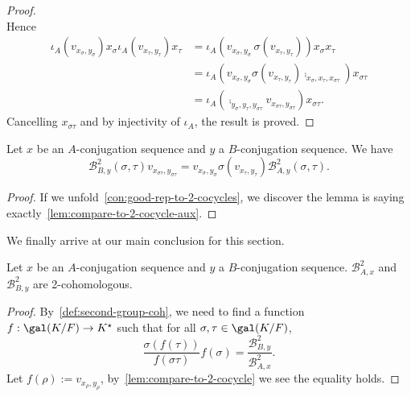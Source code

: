 \begin{proof}
\[  \]
  Hence
  \[
    \begin{aligned}    \iota_{A}\left(v_{x_{\sigma},y_{\sigma}}\right)x_{\sigma}\iota_{A}\left(v_{x_{\tau},y_{\tau}}\right)x_{\tau} &=
                                                                                                                                      \iota_{A}\left(v_{x_{\sigma},y_{\sigma}}\, \sigma\left(v_{x_{\tau},y_{\tau}}\right)\right) x_{\sigma}x_{\tau} \\
      &= \iota_{A}\left(v_{x_{\sigma},y_{\sigma}}\sigma\left(v_{x_{\tau},y_{\tau}}\right)\comp_{x_{\sigma},x_{\tau},x_{\sigma\tau}}\right)x_{\sigma\tau}\\
      &= \iota_{A}\left(\comp_{y_{\sigma},y_{\tau},y_{\sigma\tau}}v_{x_{\sigma\tau},y_{\sigma\tau}}\right)x_{\sigma\tau}.
    \end{aligned}
  \]
  Cancelling $x_{\sigma\tau}$ and by injectivity of $\iota_{A}$, the result is proved.
\end{proof}

\begin{lemma}\label{lem:compare-to-2-cocycle}
  Let $x$ be an $A$-conjugation sequence and $y$ a $B$-conjugation sequence. We have
  \[
    \mathcal{B}^{2}_{B,y}(\sigma,\tau) v_{x_{\sigma\tau},y_{\sigma\tau}} =
    v_{x_{\sigma},y_{\sigma}} \sigma\left(v_{x_{\tau},y_{\tau}}\right) \mathcal{B}^{2}_{A,y}(\sigma,\tau).
  \]
  \leanok
\end{lemma}

\begin{proof}
  If we unfold~\cref{con:good-rep-to-2-cocycles}, we discover the lemma is saying exactly~\cref{lem:compare-to-2-cocycle-aux}.
\end{proof}

We finally arrive at our main conclusion for this section.
\begin{corollary}\label{cor:to-2-cocycle-wd}
  Let $x$ be an $A$-conjugation sequence and $y$ a $B$-conjugation sequence. $\mathcal{B}^{2}_{A,x}$ and $\mathcal{B}^{2}_{B,y}$ are 2-cohomologous.
  \leanok
\end{corollary}
\begin{proof}
  By~\cref{def:second-group-coh}, we need to find a function $f : \gal(K/F)\to K^{\star}$ such that for all $\sigma, \tau\in\gal(K/F)$,
  \[
    \frac{\sigma\left(f(\tau)\right)}{f\left(\sigma\tau\right)}f(\sigma)=\frac{\mathcal{B}^{2}_{B,y}}{\mathcal{B}^{2}_{A,x}}.
  \]
  Let $f(\rho) := v_{x_{\rho},y_{\rho}}$, by~\cref{lem:compare-to-2-cocycle} we see the equality holds.
\end{proof}

